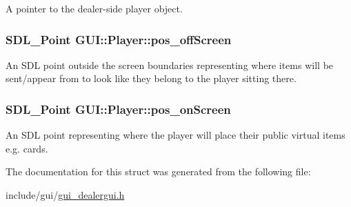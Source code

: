 A pointer to the dealer-\/side player object. 

\hypertarget{structGUI_1_1Player_ab60cdc012c16dab854828c01c413bdaf}{
\subsubsection[{pos\-\_\-off\-Screen}]{\setlength{\rightskip}{0pt plus 5cm}S\-D\-L\-\_\-\-Point G\-U\-I\-::\-Player\-::pos\-\_\-off\-Screen}}\label{structGUI_1_1Player_ab60cdc012c16dab854828c01c413bdaf}


An S\-D\-L point outside the screen boundaries representing where items will be sent/appear from to look like they belong to the player sitting there. 

\hypertarget{structGUI_1_1Player_ae17ed358dbf130cd020bbb3db2b71dce}{
\subsubsection[{pos\-\_\-on\-Screen}]{\setlength{\rightskip}{0pt plus 5cm}S\-D\-L\-\_\-\-Point G\-U\-I\-::\-Player\-::pos\-\_\-on\-Screen}}\label{structGUI_1_1Player_ae17ed358dbf130cd020bbb3db2b71dce}


An S\-D\-L point representing where the player will place their public virtual items e.\-g. cards. 



The documentation for this struct was generated from the following file\-:\begin{DoxyCompactItemize}
\item 
include/gui/\hyperlink{gui__dealergui_8h}{gui\-\_\-dealergui.\-h}\end{DoxyCompactItemize}

